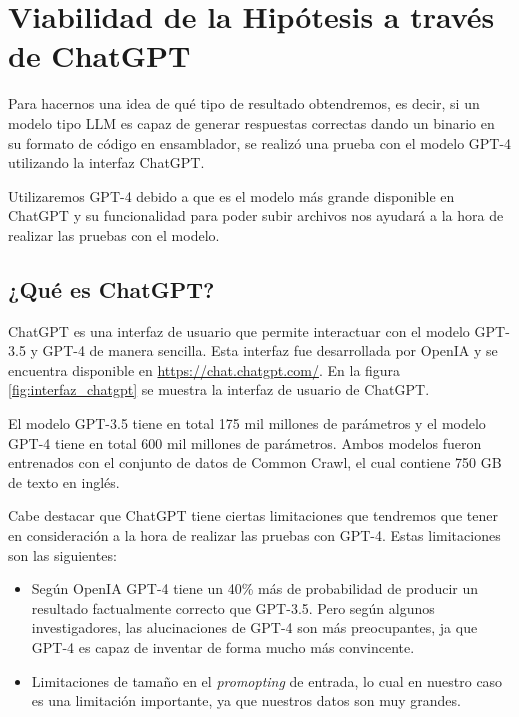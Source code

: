\chapter{Viabilidad de la Hipótesis a través de ChatGPT}
\label{cap:viabilidad_hipotesis}


Para hacernos una idea de qué tipo de resultado obtendremos, es decir, si un modelo
tipo LLM es capaz de generar respuestas correctas dando un binario en su formato
de código en ensamblador, se realizó una prueba con el modelo GPT-4 utilizando
la interfaz ChatGPT.

Utilizaremos GPT-4 debido a que es el modelo más grande disponible en ChatGPT y su
funcionalidad para poder subir archivos nos ayudará a la hora de realizar las pruebas
con el modelo.

\section{¿Qué es ChatGPT?}
\label{sec:que_es_chatgpt}


ChatGPT es una interfaz de usuario que permite interactuar con el modelo GPT-3.5 y GPT-4
de manera sencilla. Esta interfaz fue desarrollada por OpenIA y se encuentra disponible
en \url{https://chat.chatgpt.com/}. En la figura \ref{fig:interfaz_chatgpt} se muestra la interfaz
de usuario de ChatGPT.

El modelo GPT-3.5 tiene en total 175 mil millones de parámetros y el modelo GPT-4 tiene
en total 600 mil millones de parámetros. Ambos modelos fueron entrenados con el conjunto
de datos de Common Crawl, el cual contiene 750 GB de texto en inglés.

Cabe destacar que ChatGPT tiene ciertas limitaciones que tendremos que tener en consideración
a la hora de realizar las pruebas con GPT-4. Estas limitaciones son las siguientes:

\begin{itemize}
    \item Según OpenIA GPT-4 tiene un 40\% más de probabilidad de producir un resultado
        factualmente correcto que GPT-3.5. Pero según algunos investigadores, las
        alucinaciones de GPT-4 son más preocupantes, ja que GPT-4 es capaz de inventar
        de forma mucho más convincente.
    \item Limitaciones de tamaño en el \textit{promopting} de entrada, lo cual en nuestro
        caso es una limitación importante, ya que nuestros datos son muy grandes.
\end{itemize}

